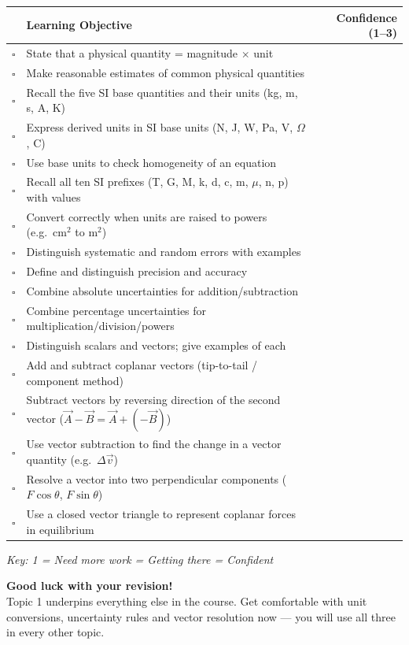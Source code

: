 \begin{tcolorbox}[colback=white, colframe=darkblue, breakable]
\renewcommand{\arraystretch}{1.5}
\begin{tabular}{@{} c p{11cm} r @{}}
\toprule
 & \textbf{Learning Objective} & \textbf{Confidence (1--3)} \\
\midrule
$\square$ & State that a physical quantity = magnitude $\times$ unit & \\
$\square$ & Make reasonable estimates of common physical quantities & \\
$\square$ & Recall the five SI base quantities and their units (kg, m, s, A, K) & \\
$\square$ & Express derived units in SI base units (N, J, W, Pa, V, $\Omega$, C) & \\
$\square$ & Use base units to check homogeneity of an equation & \\
$\square$ & Recall all ten SI prefixes (T, G, M, k, d, c, m, $\mu$, n, p) with values & \\
$\square$ & Convert correctly when units are raised to powers (e.g.\ cm$^2$ to m$^2$) & \\
$\square$ & Distinguish systematic and random errors with examples & \\
$\square$ & Define and distinguish precision and accuracy & \\

$\square$ & Combine absolute uncertainties for addition/subtraction & \\
$\square$ & Combine percentage uncertainties for multiplication/division/powers & \\
$\square$ & Distinguish scalars and vectors; give examples of each & \\
$\square$ & Add and subtract coplanar vectors (tip-to-tail / component method) & \\
$\square$ & Subtract vectors by reversing direction of the second vector ($\vec{A}-\vec{B} = \vec{A}+(-\vec{B})$) & \\
$\square$ & Use vector subtraction to find the change in a vector quantity (e.g.\ $\Delta\vec{v}$) & \\
$\square$ & Resolve a vector into two perpendicular components ($F\cos\theta$, $F\sin\theta$) & \\
$\square$ & Use a closed vector triangle to represent coplanar forces in equilibrium & \\
\bottomrule
\end{tabular}
\vspace{0.5em}
\textit{Key: 1 = Need more work  = Getting there  = Confident}
\end{tcolorbox}

\vspace{1em}
\begin{motivationbox}
\centering
\textbf{\color{darkblue}Good luck with your revision!}\\[0.2em]
{\color{darkgray}\small Topic 1 underpins everything else in the course. Get comfortable with unit conversions, uncertainty rules and vector resolution now — you will use all three in every other topic.}
\end{motivationbox}
